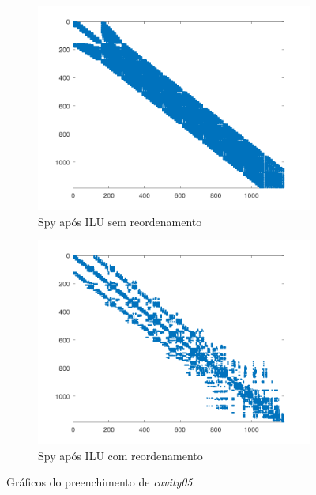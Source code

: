 \begin{figure}[H]
    \centering
    \begin{subfigure}[t]{0.4\linewidth}
         \centering
         \includegraphics[width=\textwidth]{images/cavity05_spyM_ILU_sem.png}
         \caption{Spy após ILU sem reordenamento}
         \label{fig:cavity-ILU-s}
    \end{subfigure}
    \quad
    \begin{subfigure}[t]{0.4\linewidth}
         \centering
         \includegraphics[width=\textwidth]{images/cavity05_spyM_ILU_com.png}
         \caption{Spy após ILU com reordenamento}
         \label{fig:cavity-ILU-c}
    \end{subfigure}
    \caption{Gráficos do preenchimento de \textit{cavity05}.}
    \label{fig:cavity}
\end{figure}